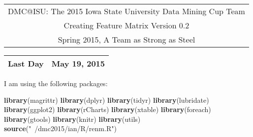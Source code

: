 \documentclass[10pt]{report}
\newenvironment{Shaded}{}{}
\newcommand{\KeywordTok}[1]{\textcolor[rgb]{0.00,0.44,0.13}{\textbf{{#1}}}}
\newcommand{\StringTok}[1]{\textcolor[rgb]{0.25,0.44,0.63}{{#1}}}
\newcommand{\NormalTok}[1]{{#1}}
\begin{document}
\thispagestyle{empty}%
\begin{center}%
    \renewcommand{\arraystretch}{1.5}%
    \begin{tabular}{c}%
       \Large{DMC@ISU: The 2015 Iowa State University Data Mining Cup Team}\\
       Creating Feature Matrix Version 0.2\\
       Spring 2015, A Team as Strong as Steel \\
    \end{tabular}
\end{center}

\begin{center}
 \renewcommand{\arraystretch}{1.5}
 \begin{tabular*}{0.65\textwidth}{r@{:\hspace{.3cm}}l}
    \hline
    
    
    Last Day&  May 19, 2015\\
    \hline
 \end{tabular*}
\end{center}

I am using the following packages:

\begin{Shaded}
\begin{Highlighting}[]
   \KeywordTok{library}\NormalTok{(magrittr)}
   \KeywordTok{library}\NormalTok{(dplyr)}
   \KeywordTok{library}\NormalTok{(tidyr)}
   \KeywordTok{library}\NormalTok{(lubridate)}
   \KeywordTok{library}\NormalTok{(ggplot2)}
   \KeywordTok{library}\NormalTok{(rCharts)}
   \KeywordTok{library}\NormalTok{(xtable)}
   \KeywordTok{library}\NormalTok{(foreach)}
   \KeywordTok{library}\NormalTok{(gtools)}
   \KeywordTok{library}\NormalTok{(knitr)}
   \KeywordTok{library}\NormalTok{(utils)}
   \KeywordTok{source}\NormalTok{(}\StringTok{"~/dmc2015/ian/R/renm.R"}\NormalTok{)}
\end{Highlighting}
\end{Shaded}
\end{document}
